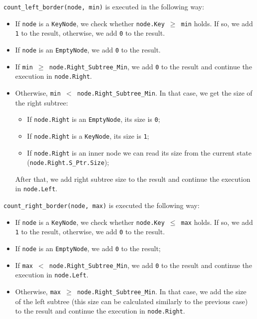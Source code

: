 \documentclass[times, dvipsnames,%
               languages={russian,english} %
              ]{itmo-student-thesis}
\begin{document}
\bigbreak

\texttt{count\_left\_border(node, min)} is executed in the following way:

\begin{itemize}
    \item If \texttt{node} is a \texttt{KeyNode}, we check whether \texttt{node.Key $\geq$ min} holds. If so, we add \texttt{1} to the result, otherwise, we add \texttt{0} to the result.
    
    \item If \texttt{node} is an \texttt{EmptyNode}, we add \texttt{0} to the result.
    
    \item If \texttt{min $\geq$ node.Right\_Subtree\_Min}, we add \texttt{0} to the result and continue the execution in \texttt{node.Right}.
    
    \item Otherwise, \texttt{min $<$ node.Right\_Subtree\_Min}. In that case, we get the size of the right subtree:
    
    \begin{itemize}
        \item If \texttt{node.Right} is an \texttt{EmptyNode}, its size is \texttt{0};
        
        \item If \texttt{node.Right} is a \texttt{KeyNode}, its size is \texttt{1};
        
        \item If \texttt{node.Right} is an inner node we can read its size from the current state (\texttt{node.Right.S\_Ptr.Size});
    \end{itemize}
    
    After that, we add right subtree size to the result and continue the execution in \texttt{node.Left}.
\end{itemize}

\bigbreak

\texttt{count\_right\_border(node, max)} is executed the following way:

\begin{itemize}
    \item If \texttt{node} is a \texttt{KeyNode}, we check whether \texttt{node.Key $\leq$ max} holds. If so, we add \texttt{1} to the result, otherwise, we add \texttt{0} to the result.
    
    \item If \texttt{node} is an \texttt{EmptyNode}, we add \texttt{0} to the result;
    
    \item If \texttt{max $<$ node.Right\_Subtree\_Min}, we add \texttt{0} to the result and continue the execution in \texttt{node.Left}.
    
    \item Otherwise, \texttt{max $\geq$ node.Right\_Subtree\_Min}. In that case, we add the size of the left subtree (this size can be calculated similarly to the previous case) to the result and continue the execution in \texttt{node.Right}.
\end{itemize}
\end{document}
